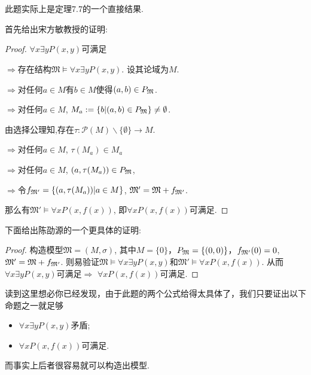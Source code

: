 \documentclass{article}
\begin{document}
\section{}
此题实际上是定理7.7的一个直接结果. 

首先给出宋方敏教授的证明:
\begin{proof}
$ \forall x \exists y  P(x, y) $可满足

$\Rightarrow$存在结构$\mathfrak{M} \models \forall x \exists y P(x, y)$. 设其论域为$M$. 

$\Rightarrow$对任何$a \in M$有$b \in M$使得$(a, b) \in P_{\frak{M}}$. 

$\Rightarrow$对任何$a\in M$, $M_a := \{b|(a, b)\in P_{\frak{M}}\} \neq \emptyset$.

由选择公理知,存在$\tau : \mathcal{P} (M) \backslash \{\emptyset\} \rightarrow M$. 



$\Rightarrow$对任何$a\in M$, $\tau(M_a) \in M_a$ 

$\Rightarrow$对任何$a\in M$, $(a,\tau(M_a)) \in P_{\frak{M}}$, 

$\Rightarrow$令$f_{\frak{M'}}=\{(a,\tau(M_a))|a \in M\}$, $\mathfrak{M'} = \mathfrak{M} +f_{\frak{M'}}$.

那么有$\mathfrak{M'} \vDash \forall x P(x, f(x))$,
即$\forall x P(x, f(x))$可满足. 

\end{proof}

下面给出陈劭源的一个更具体的证明: 
\begin{proof}
	构造模型$\mathfrak{M} = (M, \sigma)$, 其中$M = \{0\}$，$P_{\frak{M}} = \{(0, 0)\}$，$f_{\frak{M'}}(0) = 0$, $\mathfrak{M'} = \mathfrak{M} + f_{\frak{M'}}$. 则易验证$\mathfrak{M} \models \forall x \exists y P(x, y)$和$\mathfrak{M'} \models \forall x P(x, f(x))$. 从而$\forall x \exists y P(x, y)$可满足$\Rightarrow$ $\forall x P(x, f(x))$可满足. 
\end{proof}

读到这里想必你已经发现，由于此题的两个公式给得太具体了，我们只要证出以下命题之一就足够

\begin{itemize}
	\item $\forall x \exists y P(x, y)$矛盾; 
	\item $\forall x P(x, f(x))$可满足. 
\end{itemize}

而事实上后者很容易就可以构造出模型. 

\section{}
\end{document}
